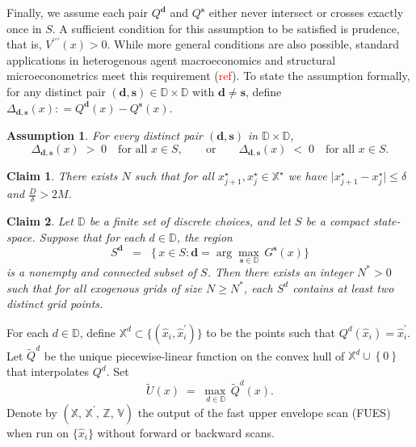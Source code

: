 \documentclass[12pt]{article}
\newtheorem{ass}{Assumption}
\newtheorem{claim}{Claim}
\newcommand{\DChSet}{\mathbb{D}}
\newcommand{\dVecVar}{\mathbf{d}}
\newcommand{\sVecVar}{\mathbf{s}}
\begin{document}
Finally, we assume each pair $Q^{\dVecVar}$ and $Q^{\sVecVar}$ either never intersect or crosses exactly once in $S$. A sufficient condition for this assumption to be satisfied is prudence, that is, $V^{\prime\prime\prime}(x)>0$. While more general conditions are also possible, standard applications in heterogenous agent macroeconomics and structural microeconometrics meet this requirement (\textcolor{red}{ref}). To state the assumption formally, for any distinct pair $(\dVecVar,\sVecVar)\in \mathbb{D}\times\mathbb{D}$ with $\dVecVar\neq \sVecVar$, define $\Delta_{\dVecVar,\sVecVar}(x) \colon = 
   Q^{\dVecVar}(x) - Q^{\sVecVar}(x)$. 

\begin{ass}\label{ass:single_crossing}
For every distinct pair $(\dVecVar,\sVecVar)$ in $\mathbb{D}\times\mathbb{D}$,
%
\begin{equation*}
   \Delta_{\dVecVar,\sVecVar}(x)
   \;>\; 0
   \quad\text{for all } x\in S,
   \qquad
   \text{or}
   \qquad
   \Delta_{\dVecVar,\sVecVar}(x)
   \;<\; 0
   \quad\text{for all } x\in S. 
\end{equation*}

\end{ass}


\begin{claim}\label{claim:grid_big}
 There exists $N$ such that for all $x_{j+1}^{\star}, x_{j}^{\star} \in \mathbb{X}^{\star}$ we have $\vert x_{j+1}^{\star}- x_{j}^{\star}\vert \leq \delta$ and $\frac{D}{\delta}> 2M$.
\end{claim}

\begin{claim}\label{claim:connected_optimal_regions}
Let $\DChSet$ be a finite set of discrete choices, and let $S$ be a compact state-space.
Suppose that for each $d\in \DChSet$, the region
\[
   S^{\dVecVar}
   \;\;=\;\;
   \bigl\{\,x \in S : \dVecVar = \arg\max_{\,\sVecVar \in \DChSet}\,G^{\sVecVar}(x)\bigr\}
\]
is a nonempty and connected subset of $S$.  Then there exists an integer $N^{\ast}>0$ such that for all exogenous grids of size $N \ge N^{\ast}$, each $S^{d}$ contains \emph{at least two distinct} grid points. 
\end{claim}


For each $d\in\DChSet$, define $\mathbb{X}^{d}\subset\{\left(\hat{x}_{i},\hat{x}_{i}^{\prime}\right)\}$ to be the points such that $Q^{d}(\hat{x}_{i}) = \hat{x}_{i}^{\prime}$. Let $\widetilde{Q}^{d}$ be the unique piecewise-linear function on the convex hull of $\mathbb{X}^{d}\cup \left\{0\right\}$ that interpolates $Q^{d}$. 
Set
\[
    \widetilde{U}(x) 
    \;=\;
    \max_{\,d\in\DChSet}\,\widetilde{Q}^{d}(x).
\]
Denote by $(\mathbb{X},\,\mathbb{X}^{\prime},\,\mathbb{Z},\,\mathbb{V})$ the output of the fast upper envelope scan (FUES) when run on $\{\hat{x}_{i}\}$ without forward or backward scans.
\end{document}
